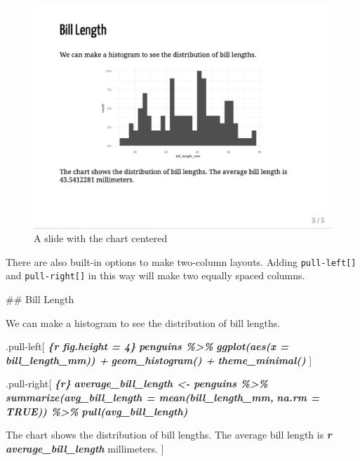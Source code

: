 \documentclass[
]{book}
\newenvironment{Shaded}{\begin{snugshade}}{\end{snugshade}}
\newcommand{\FunctionTok}[1]{\textcolor[rgb]{0.00,0.00,0.00}{#1}}
\newcommand{\InformationTok}[1]{\textcolor[rgb]{0.56,0.35,0.01}{\textbf{\textit{#1}}}}
\newcommand{\NormalTok}[1]{#1}
\begin{document}
\begin{figure}
\includegraphics[width=1\linewidth]{assets/center-chart} \caption{A slide with the chart centered}\label{fig:center-chart}
\end{figure}

There are also built-in options to make two-column layouts. Adding \texttt{pull-left{[}{]}} and \texttt{pull-right{[}{]}} in this way will make two equally spaced columns.

\begin{Shaded}
\begin{Highlighting}[]
\FunctionTok{\#\# Bill Length}

\NormalTok{We can make a histogram to see the distribution of bill lengths.}

\NormalTok{.pull{-}left[}
\InformationTok{\textasciigrave{}\textasciigrave{}\textasciigrave{}\{r fig.height = 4\}}
\InformationTok{penguins \%\textgreater{}\% }
\InformationTok{  ggplot(aes(x = bill\_length\_mm)) +}
\InformationTok{  geom\_histogram() +}
\InformationTok{  theme\_minimal()}
\InformationTok{\textasciigrave{}\textasciigrave{}\textasciigrave{}}
\NormalTok{]}

\NormalTok{.pull{-}right[}
\InformationTok{\textasciigrave{}\textasciigrave{}\textasciigrave{}\{r\}}
\InformationTok{average\_bill\_length \textless{}{-} penguins \%\textgreater{}\% }
\InformationTok{  summarize(avg\_bill\_length = mean(bill\_length\_mm,}
\InformationTok{                                   na.rm = TRUE)) \%\textgreater{}\% }
\InformationTok{  pull(avg\_bill\_length)}
\InformationTok{\textasciigrave{}\textasciigrave{}\textasciigrave{}}

\NormalTok{The chart shows the distribution of bill lengths. The average bill length is }\InformationTok{\textasciigrave{}r average\_bill\_length\textasciigrave{}}\NormalTok{ millimeters.}
\NormalTok{]}
\end{Highlighting}
\end{Shaded}
\end{document}
